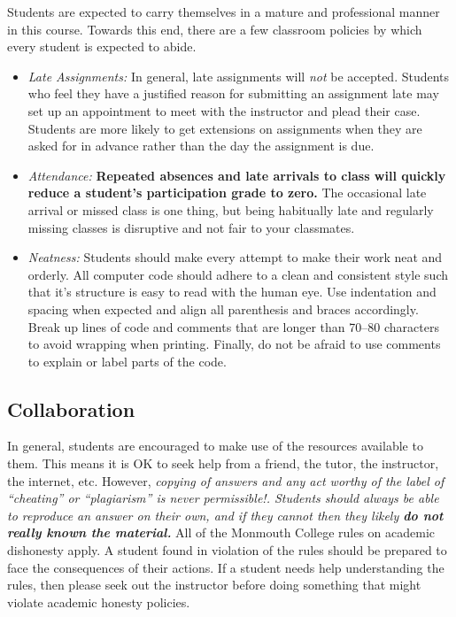 \documentclass[10pt]{article}
\begin{document}
Students are expected to carry themselves in a mature and professional manner in this course. Towards this end, there are a few classroom policies by which every student is expected to abide.
\begin{itemize}

\item \textit{Late Assignments: } In general, late assignments will \textit{not} be accepted.  Students who feel they have a justified reason for submitting an assignment late may set up an appointment to meet with the instructor and plead their case.  Students are more likely to get extensions on assignments when they are asked for in advance rather than the day the assignment is due.

\item \textit{Attendance: } \textbf{Repeated absences and late arrivals to class will quickly reduce a student's participation grade to zero.}  The occasional late arrival or missed class is one thing, but being habitually late and regularly missing classes is disruptive and not fair to your classmates.

\item \textit{Neatness:}  Students should make every attempt to make their work neat and orderly. All computer code should adhere to a clean and consistent style such that it's structure is easy to read with the human eye. Use indentation and spacing when expected and align all parenthesis and braces accordingly. Break up lines of code and comments that are longer than 70--80 characters to avoid wrapping when printing. Finally, do not be afraid to use comments to explain or label parts of the code.

\end{itemize}


\subsection{Collaboration}

In general, students are encouraged to make use of the resources available to them.  This means it is OK to seek help from a friend, the tutor, the instructor, the internet, etc.  However, \textit{copying of answers and any act worthy of the label of ``cheating'' or ``plagiarism'' is never permissible!. Students should always be able to reproduce an answer on their own, and if they cannot then they likely \textbf{do not really known the material.}} All of the Monmouth College rules on academic dishonesty apply.  A student found in violation of the rules should be prepared to face the consequences of their actions. If a student needs help understanding the rules, then please seek out the instructor before doing something that might violate academic honesty policies.
\end{document}
